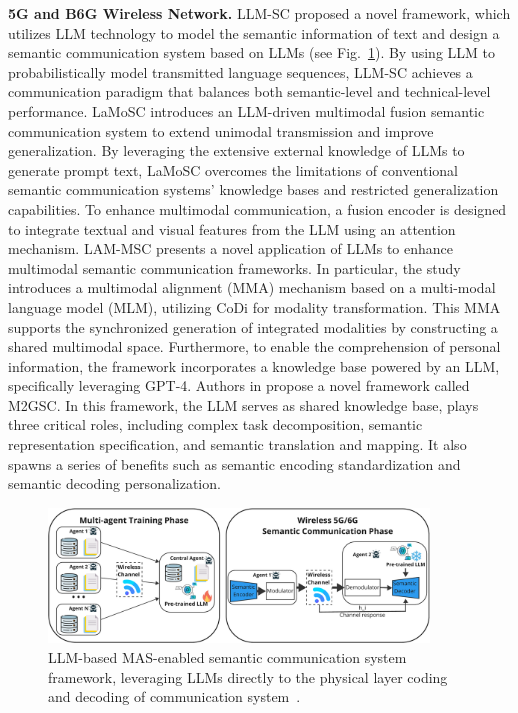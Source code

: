 \documentclass[acmsmall,nonacm]{acmart}
\begin{document}
    \textbf{5G and B6G Wireless Network.}
    LLM-SC \cite{wang2024largelanguagemodelenabled} proposed a novel framework, which utilizes LLM technology to model the semantic information of text and design a semantic communication system based on LLMs (see Fig.~\ref{fig:LLM-SC}). By using LLM to probabilistically model transmitted language sequences, LLM-SC achieves a communication paradigm that balances both semantic-level and technical-level performance. LaMoSC \cite{10531769} introduces an LLM-driven multimodal fusion semantic communication system to extend unimodal transmission and improve generalization. By leveraging the extensive external knowledge of LLMs to generate prompt text, LaMoSC overcomes the limitations of conventional semantic communication systems' knowledge bases and restricted generalization capabilities. To enhance multimodal communication, a fusion encoder is designed to integrate textual and visual features from the LLM using an attention mechanism.
    LAM-MSC \cite{10670195} presents a novel application of LLMs to enhance multimodal semantic communication frameworks. In particular, the study introduces a multimodal alignment (MMA) mechanism based on a multi-modal language model (MLM), utilizing CoDi for modality transformation. This MMA supports the synchronized generation of integrated modalities by constructing a shared multimodal space. Furthermore, to enable the comprehension of personal information, the framework incorporates a knowledge base powered by an LLM, specifically leveraging GPT-4.
    Authors in \cite{yang2024rethinkinggenerativesemanticcommunication} propose a novel framework called M2GSC. In this framework, the LLM serves as shared knowledge base, plays three critical roles, including complex task decomposition, semantic representation specification, and semantic translation and mapping. It also spawns a series of benefits such as semantic encoding standardization and semantic decoding personalization.
    \begin{figure}
        \includegraphics[width=0.9\textwidth]{image-lib/LLM-SC-v2.pdf}
        \caption{LLM-based MAS-enabled semantic communication system framework, leveraging LLMs directly to the physical layer coding and decoding of communication system~\cite{wang2024largelanguagemodelenabled}.}\label{fig:LLM-SC}
        \Description{}
    \end{figure}
\end{document}
